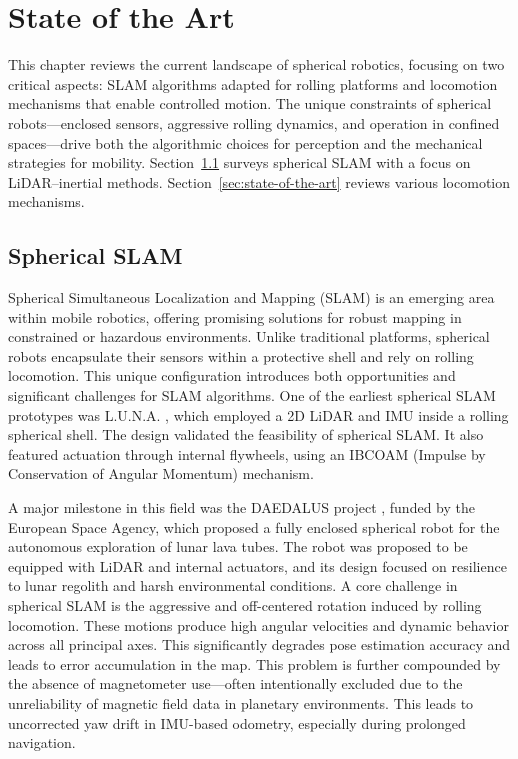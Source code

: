 \documentclass[english, bachelor, utf8]{base/thesis_telematics}
\begin{document}
\chapter{State of the Art}
This chapter reviews the current landscape of spherical robotics, focusing on two critical aspects: SLAM algorithms adapted for rolling platforms and locomotion mechanisms that enable controlled motion. The unique constraints of spherical robots—enclosed sensors, aggressive rolling dynamics, and operation in confined spaces—drive both the algorithmic choices for perception and the mechanical strategies for mobility. Section~\ref{AA} surveys spherical SLAM with a focus on LiDAR–inertial methods. Section~\ref{sec:state-of-the-art} reviews various locomotion mechanisms.

\section{Spherical SLAM}\label{AA}
Spherical Simultaneous Localization and Mapping (SLAM) is an emerging area within mobile robotics, offering promising solutions for robust mapping in constrained or hazardous environments. 
Unlike traditional platforms, spherical robots encapsulate their sensors within a protective shell and rely on rolling locomotion. 
This unique configuration introduces both opportunities and significant challenges for SLAM algorithms. 
One of the earliest spherical SLAM prototypes was L.U.N.A. \cite{luna}, which employed a 2D LiDAR and IMU inside a rolling spherical shell. 
The design validated the feasibility of spherical SLAM. 
It also featured actuation through internal flywheels, using an IBCOAM (Impulse by Conservation of Angular Momentum) mechanism.

A major milestone in this field was the DAEDALUS project \cite{DAEDALUS}, funded by the European Space Agency, which proposed a fully enclosed spherical robot for the autonomous exploration of lunar lava tubes. 
The robot was proposed to be equipped with LiDAR and internal actuators, and its design focused on resilience to lunar regolith and harsh environmental conditions.
A core challenge in spherical SLAM is the aggressive and off-centered rotation induced by rolling locomotion. 
These motions produce high angular velocities and dynamic behavior across all principal axes. 
This significantly degrades pose estimation accuracy and leads to error accumulation in the map. 
This problem is further compounded by the absence of magnetometer use—often intentionally excluded due to the unreliability of magnetic field data in planetary environments.
This leads to uncorrected yaw drift in IMU-based odometry, especially during prolonged navigation.
\end{document}
